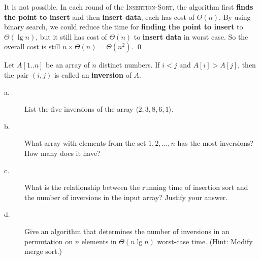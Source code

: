 \answer

It is not possible. In each round of the \textsc{Insertion-Sort}, the algorithm first \textbf{finds the point to insert} and then \textbf{insert data},
each has cost of $\Theta(n)$. By using binary search, we could reduce the time for \textbf{finding the point to insert} to $\Theta(\lg n)$,
but it still has cost of $\Theta(n)$  to \textbf{insert data} in worst case. So the overall cost is still $n\times \Theta(n) = \Theta(n^2)$.
\qed


Let $A[1..n]$ be an array of $n$ distinct numbers. If $i<j$ and $A[i]>A[j]$, then the pair $(i,j)$ is called an \textbf{inversion} of $A$.

\begin{description}
\item[a. \hspace{9pt}] List the five inversions of the array $\langle2, 3, 8, 6, 1\rangle$.

\item[b. \hspace{9pt}] What array with elements from the set ${1, 2, ..., n}$ has the most inversions? How many does it have?

\item[c. \hspace{9pt}] What is the relationship between the running time of insertion sort and the number of inversions in the input array? Justify your answer.

\item[d. \hspace{9pt}] Give an algorithm that determines the number of inversions in an permutation on $n$ elements in $\Theta(n\lg n)$ worst-case time. (Hint: Modify merge sort.)
\end{description}

\answer

